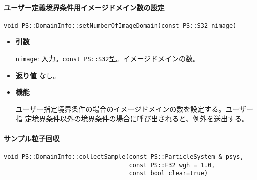 




\paragraph{ユーザー定義境界条件用イメージドメイン数の設定}
\mbox{}

\begin{screen}
\begin{verbatim}
void PS::DomainInfo::setNumberOfImageDomain(const PS::S32 nimage)
\end{verbatim}
\end{screen}

\begin{itemize}

\item{{\bf 引数}}

{\tt nimage}: 入力。{\tt const PS::S32}型。イメージドメインの数。

\item{{\bf 返り値}}
なし。

\item{{\bf 機能}}

ユーザー指定境界条件の場合のイメージドメインの数を設定する。ユーザー指
定境界条件以外の境界条件の場合に呼び出されると、例外を送出する。

\end{itemize}

\paragraph{サンプル粒子回収}
\mbox{}

\begin{screen}
\begin{verbatim}
void PS::DomainInfo::collectSample(const PS::ParticleSystem & psys,
                                   const PS::F32 wgh = 1.0,
                                   const bool clear=true)
\end{verbatim}
\end{screen}

